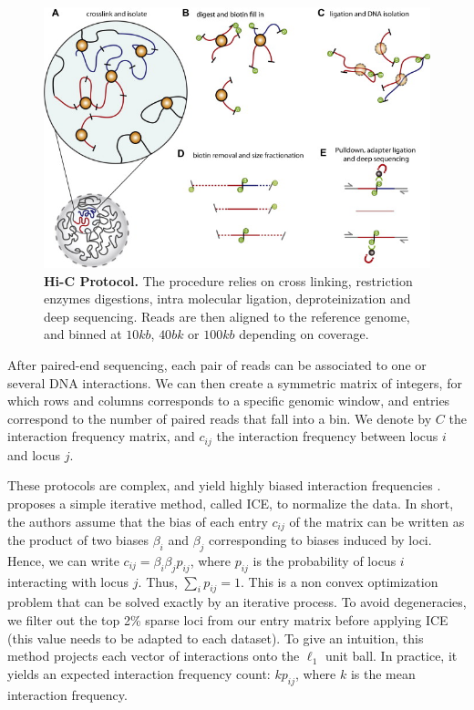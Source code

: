 \begin{figure}
\begin{center}
\includegraphics[width=0.8\linewidth]{figures/hic_protocol.png}
\end{center}
\caption{\textbf{Hi-C Protocol.} The procedure relies on cross linking,
restriction enzymes digestions, intra molecular ligation, deproteinization and
deep sequencing. Reads are then aligned to the reference genome, and binned at
$10kb$, $40bk$ or $100kb$ depending on coverage.}
\label{fig:protocol}
\end{figure}


After paired-end sequencing, each pair of reads can be associated to one
\citep{lieberman-aiden:comprehensive} or several \citep{ay:identifying} DNA
interactions. We can then create a symmetric matrix of integers, for which
rows and columns corresponds to a specific genomic window, and entries
correspond to the number of paired reads that fall into a bin. We denote by
$C$ the interaction frequency matrix, and $c_{ij}$ the interaction frequency
between locus $i$ and locus $j$.

These protocols are complex, and yield highly biased interaction frequencies
\citep{imakaev:iterative, cournac:normalization, yaffe:probabilistic}.
\citet{imakaev:iterative} proposes a simple iterative method, called ICE, to
normalize the data. In short, the authors assume that the bias of each entry
$c_{ij}$ of the matrix can be written as the product of two biases $\beta_i$
and $\beta_j$ corresponding to biases induced by loci. Hence, we can write
$c_{ij} = \beta_i \beta_j p_{ij}$, where $p_{ij}$ is the probability of locus
$i$ interacting with locus $j$. Thus, $\sum_i p_{ij} = 1$. This is a non
convex optimization problem that can be solved exactly by an iterative
process. To avoid degeneracies, we filter out the top 2\% sparse loci from our
entry matrix before applying ICE (this value needs to be adapted to each
dataset). To give an intuition, this method projects each vector of
interactions onto the $\ell_1$ unit ball. In practice, it yields an expected
interaction frequency count: $k p_{ij}$, where $k$ is the mean interaction
frequency.

